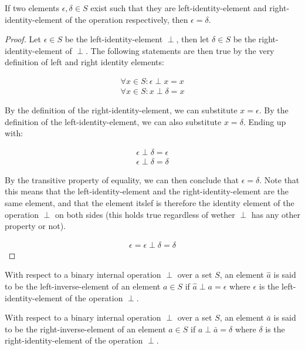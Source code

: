 \begin{lemma}
    If two elements $\epsilon, \delta \in S$ exist such that they are left-identity-element and right-identity-element of the operation 
    respectively, then $\epsilon = \delta$.
\end{lemma}
\begin{proof}
    Let $\epsilon \in S$ be the left-identity-element $\perp$, then let $\delta \in S$ be the right-identity-element of $\perp$. The following statements 
    are then true by the very definition of left and right identity elements:

    \begin{align*}
        \forall x \in S: \epsilon \perp x = x \\
        \forall x \in S: x \perp \delta = x
    \end{align*}

    By the definition of the right-identity-element, we can substitute $x = \epsilon$. By the definition of the 
    left-identity-element, we can also substitute $x = \delta$. Ending up with:

    \begin{align*}
        \epsilon \perp \delta = \epsilon \\
        \epsilon \perp \delta = \delta
    \end{align*}

    By the transitive property of equality, we can then conclude that $\epsilon = \delta$. Note that this means that 
    the left-identity-element and the right-identity-element are the same element, and that the element itslef is therefore 
    the identity element of the operation $\perp$ on both sides (this holds true regardless of wether $\perp$ has any other property or not).

    \begin{align*}
        \epsilon = \epsilon \perp \delta = \delta
    \end{align*}

\end{proof}


\begin{definition}
    With respect to a binary internal operation $\perp$ over a set $S$, an element $\hat{a}$ is said to be the left-inverse-element of
    an element $a \in S$ if $\hat{a} \perp a = \epsilon$ where $\epsilon$ is the left-identity-element of the operation $\perp$.
\end{definition}

\begin{definition}
    With respect to a binary internal operation $\perp$ over a set $S$, an element $\bar{a}$ is said to be the right-inverse-element of
    an element $a \in S$ if $a \perp \bar{a} = \delta$ where $\delta$ is the right-identity-element of the operation $\perp$.
\end{definition}

